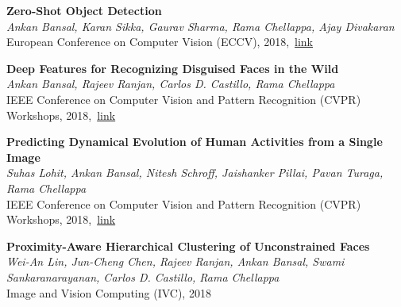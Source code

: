 \documentclass[11pt, a4paper]{article}
\begin{document}
\vspace{3pt}

\textbf{Zero-Shot Object Detection}\\
\textit{Ankan Bansal, Karan Sikka, Gaurav Sharma, Rama Chellappa, Ajay Divakaran}\\
European Conference on Computer Vision (ECCV), 2018,~\href{http://openaccess.thecvf.com/content_ECCV_2018/html/Ankan_Bansal_Zero-Shot_Object_Detection_ECCV_2018_paper.html}{link}

\vspace{3pt}

%

\textbf{Deep Features for Recognizing Disguised Faces in the Wild} \\
\textit{Ankan Bansal, Rajeev Ranjan, Carlos D. Castillo, Rama Chellappa}\\
IEEE Conference on Computer Vision and Pattern Recognition (CVPR) Workshops,
2018,~\href{http://openaccess.thecvf.com/content_cvpr_2018_workshops/w1/html/Bansal_Deep_Features_for_CVPR_2018_paper.html}{link}

\vspace{3pt}

\textbf{Predicting Dynamical Evolution of Human Activities from a Single Image} \\
\textit{Suhas Lohit, Ankan Bansal, Nitesh Schroff, Jaishanker Pillai, Pavan Turaga, Rama
Chellappa}\\
IEEE Conference on Computer Vision and Pattern Recognition (CVPR) Workshops,
2018,~\href{http://openaccess.thecvf.com/content_cvpr_2018_workshops/w10/html/Lohit_Predicting_Dynamical_Evolution_CVPR_2018_paper.html}{link}

\vspace{3pt}

\textbf{Proximity-Aware Hierarchical Clustering of Unconstrained Faces} \\
\textit{Wei-An Lin, Jun-Cheng Chen, Rajeev Ranjan, Ankan Bansal, Swami Sankaranarayanan, Carlos D.
Castillo, Rama Chellappa}\\
Image and Vision Computing (IVC), 2018
\end{document}
